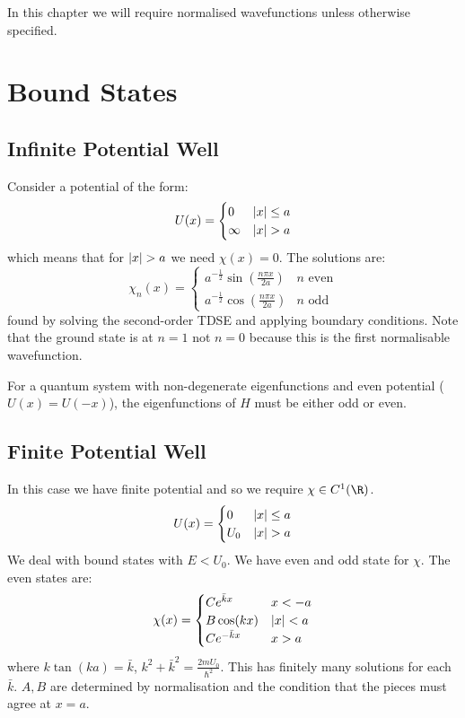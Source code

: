 \documentclass[../Main.tex]{subfiles}
\begin{document}
In this chapter we will require normalised wavefunctions unless otherwise specified.
\section{Bound States}
\subsection{Infinite Potential Well}
Consider a potential of the form:
\begin{equation*}
    U(x) =
    \begin{cases}
        0 & \lvert x\rvert \leq a \\
        \infty & \lvert x\rvert > a
    \end{cases}
\end{equation*}
which means that for $\lvert x\rvert > a$ we need $\chi(x) = 0$. The solutions are:
\begin{equation*}
    \chi_n(x) =
    \begin{cases}
        a^{-\frac12} \sin\left(\frac{n\pi x}{2a}\right) & \text{$n$ even} \\
        a^{-\frac12} \cos\left(\frac{n\pi x}{2a}\right) & \text{$n$ odd}
    \end{cases}
\end{equation*}
found by solving the second-order TDSE and applying boundary conditions. Note that the ground state is at $n = 1$ not $n = 0$ because this is the first normalisable wavefunction.
\begin{proposition}
    For a quantum system with non-degenerate eigenfunctions and even potential ($U(x) = U(-x)$), the eigenfunctions of $\hat{H}$ must be either odd or even.
    \label{propEvenOddWF}
\end{proposition}
\subsection{Finite Potential Well}
In this case we have finite potential and so we require $\chi \in C^1(\R)$.
\begin{equation*}
    U(x) =
    \begin{cases}
        0 & \lvert x\rvert \leq a \\
        U_0 & \lvert x\rvert > a
    \end{cases}
\end{equation*}
We deal with bound states with $E < U_0$. We have even and odd state for $\chi$. The even states are:
\begin{equation*}
    \chi(x) =
    \begin{cases}
        Ce^{\bar{k}x} & x < -a \\
        B\cos(kx) & \lvert x\rvert < a \\
        Ce^{-\bar{k}x} & x > a
    \end{cases}
\end{equation*}
where $k\tan(ka) = \bar{k}$, $k^2 + \bar{k}^2 = \frac{2mU_0}{\hbar^2}$. This has finitely many solutions for each $\bar{k}$. $A, B$ are determined by normalisation and the condition that the pieces must agree at $x = a$.
\end{document}
